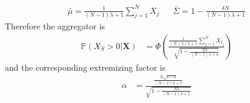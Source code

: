\documentclass[11pt]{article}
\renewcommand{\P}{\mathbb{P}}
\theoremstyle{definition}
\theoremstyle{definition}
\begin{document}
\begin{align*}
\bar{\mu} = \frac{1}{(N-1)\lambda +1}  \sum_{j=1}^N X_j 
&&  \bar{\Sigma} = 1  - \frac{\delta N}{(N-1)\lambda +1} 
\end{align*}
Therefore the  aggregator is
\begin{align}
\P\left(X_S > 0 | \boldsymbol{X}\right) &=\Phi\left(\frac{\frac{1}{(N-1)\lambda +1} \sum_{j=1}^N X_{I_j} }{\sqrt{1- \frac{N\delta}{(N-1)\lambda +1} }}  \right) \label{CompoundAggre}
\end{align}
and the corresponding extremizing factor is
\begin{align}
\alpha &= \frac{\frac{N\sqrt{1-\delta}}{(N-1)\lambda +1}}{\sqrt{1- \frac{N\delta}{(N-1)\lambda +1} }} \label{CompoundAlpha}
\end{align}
\end{document}
